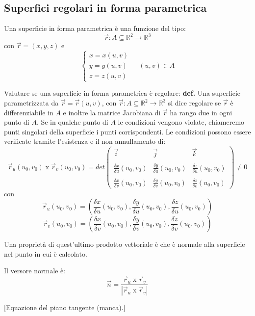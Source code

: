 \subsection{Superfici regolari in forma parametrica}
Una superficie in forma parametrica è una funzione del tipo:
\[
    \vec{r}:A \subseteq \mathbb{R}^2 \rightarrow \mathbb{R}^3
\]
con $\vec{r} = (x,y,z)$ e
\[
    \begin{cases}
        x=x(u,v) \\
        y=y(u,v)\\
        z=z(u,v)
    \end{cases} \;\;\;\;(u,v) \in A
\] 
\begin{tcolorbox}
Valutare se una superficie in forma parametrica è regolare:\newline
\textbf{def.} Una superficie parametrizzata da $\vec{r} = \vec{r}(u,v)$, con $\vec{r}: A \subseteq \mathbb{R}^2 \rightarrow \mathbb{R}^3$ si dice regolare se $\vec{r}$ è differenziabile in $A$ e inoltre la matrice Jacobiana di $\vec{r}$ ha rango due in ogni punto di $A$. Se in qualche punto di $A$ le condizioni vengono violate, chiameremo punti singolari della superficie i punti corrispondenti.\newline
Le condizioni possono essere verificate tramite l'esistenza e il non annullamento di:
\[
    \vec{r}_u(u_0, v_0) \;\text{x}\; \vec{r}_v(u_0, v_0) = det \left(\begin{matrix}
        \vec{i} & \vec{j} & \vec{k}\\
        \\
        \frac{\delta x}{\delta u}(u_0,v_0) & \frac{\delta y}{\delta u}(u_0,v_0) & \frac{\delta z}{\delta u}(u_0,v_0)\\
        \\
        \frac{\delta x}{\delta v}(u_0,v_0) & \frac{\delta y}{\delta v}(u_0,v_0) & \frac{\delta z}{\delta v}(u_0,v_0)
    \end{matrix}\right) \neq 0
\]
con
\[
    \vec{r}_u(u_0, v_0) = ( \frac{\delta x}{\delta u}(u_0,v_0) , \frac{\delta y}{\delta u}(u_0,v_0) , \frac{\delta z}{\delta u}(u_0,v_0) )
\]
\[
    \vec{r}_v(u_0, v_0) = ( \frac{\delta x}{\delta v}(u_0,v_0) , \frac{\delta y}{\delta v}(u_0,v_0) , \frac{\delta z}{\delta v}(u_0,v_0) )
\]
\end{tcolorbox}
Una proprietà di quest'ultimo prodotto vettoriale è che è normale alla superficie nel punto in cui è calcolato. 
\begin{tcolorbox}
    Il versore normale è:
    \[
        \vec{n} = \frac{\vec{r}_u \;\text{x}\; \vec{r}_v}{|\vec{r}_u \;\text{x}\; \vec{r}_v|}
    \]
\end{tcolorbox}
[Equazione del piano tangente (manca).]
